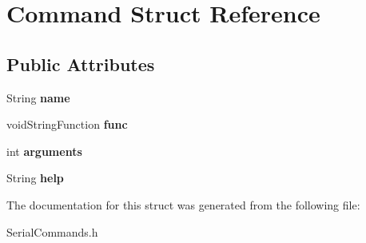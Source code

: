 \hypertarget{struct_command}{}\section{Command Struct Reference}
\label{struct_command}
\subsection*{Public Attributes}
\begin{DoxyCompactItemize}
\item 
\mbox{\label{struct_command_a19f7ad73ca8599ad47f9b7bcccc52610}} 
String {\bfseries name}
\item 
\mbox{\label{struct_command_a6778ffbcd000c94e30377020b7bc793a}} 
void\+String\+Function {\bfseries func}
\item 
\mbox{\label{struct_command_af6c0b6127ceab4c9d6d86b0bc95419ef}} 
int {\bfseries arguments}
\item 
\mbox{\label{struct_command_aa8ffd1c02706c4887cbed7fe0d9f7b49}} 
String {\bfseries help}
\end{DoxyCompactItemize}


The documentation for this struct was generated from the following file\+:\begin{DoxyCompactItemize}
\item 
Serial\+Commands.\+h\end{DoxyCompactItemize}
